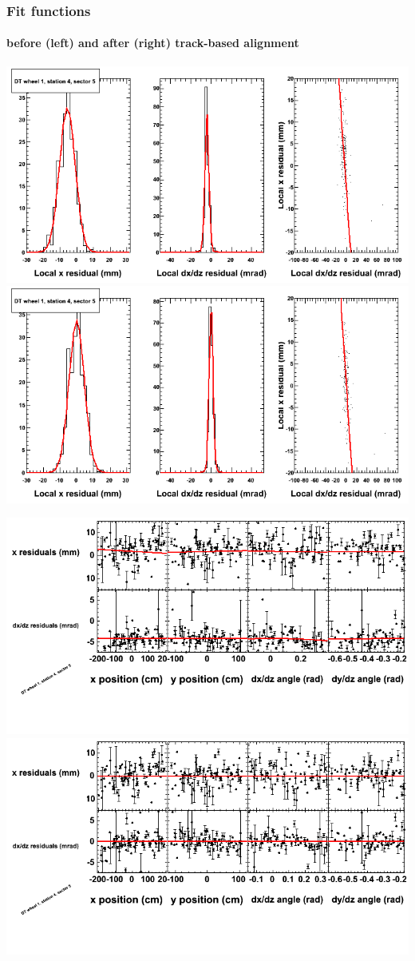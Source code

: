 \documentclass[compress]{beamer}
\begin{document}
\begin{frame}
\frametitle{Fit functions}
\framesubtitle{before (left) and after (right) track-based alignment}
\includegraphics[width=0.5\linewidth]{fitfunctions_re01/MBwhDst4sec05_bellcurves.png} \includegraphics[width=0.5\linewidth]{fitfunctions_re05/MBwhDst4sec05_bellcurves.png}

\includegraphics[width=0.5\linewidth]{fitfunctions_re01/MBwhDst4sec05_polynomials.png} \includegraphics[width=0.5\linewidth]{fitfunctions_re05/MBwhDst4sec05_polynomials.png}
\end{frame}
\end{document}
